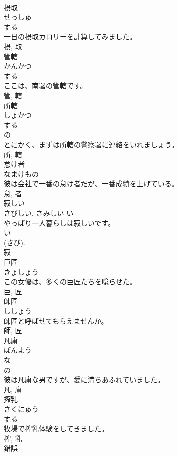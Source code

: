 \documentclass[8pt]{extreport}
\begin{document}
\begin{CJK}{UTF8}{min}
\\	摂取	
\\	せっしゅ	
\\	する 
\\	一日の摂取カロリーを計算してみました。	
\\	摂, 取	
\\	管轄	
\\	かんかつ	
\\	する 
\\	ここは、南署の管轄です。	
\\	管, 轄	
\\	所轄	
\\	しょかつ	
\\	する 
\\	の 
\\	とにかく、まずは所轄の警察署に連絡をいれましょう。	
\\	所, 轄	
\\	怠け者	
\\	なまけもの	
\\	彼は会社で一番の怠け者だが、一番成績を上げている。	
\\	怠, 者	
\\	寂しい	
\\	さびしい, さみしい	い 
\\	やっぱり一人暮らしは寂しいです。	
\\	い 
\\	(さび). 
\\	寂	
\\	巨匠	
\\	きょしょう	
\\	この女優は、多くの巨匠たちを唸らせた。	
\\	巨, 匠	
\\	師匠	
\\	ししょう	
\\	師匠と呼ばせてもらえませんか。	
\\	師, 匠	
\\	凡庸	
\\	ぼんよう	
\\	な 
\\	の 
\\	彼は凡庸な男ですが、愛に満ちあふれていました。	
\\	凡, 庸	
\\	搾乳	
\\	さくにゅう	
\\	する 
\\	牧場で搾乳体験をしてきました。	
\\	搾, 乳	
\\	錯誤	

\end{CJK}
\end{document}

